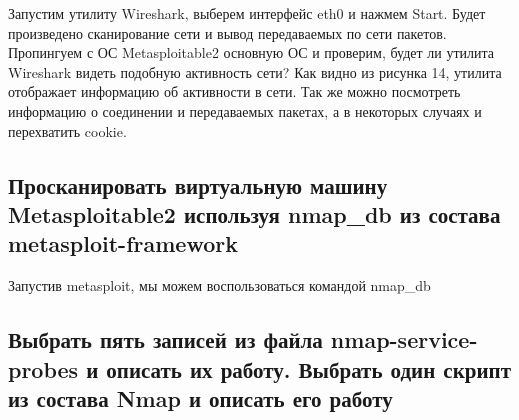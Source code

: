 \documentclass[11pt, a4paper]{article}		%
\begin{document}
Запустим утилиту Wireshark, выберем интерфейс eth0 и нажмем Start. Будет произведено сканирование сети и вывод передаваемых по сети пакетов. Пропингуем с ОС Metasploitable2 основную ОС и проверим, будет ли утилита Wireshark видеть подобную активность сети? Как видно из рисунка 14, утилита отображает информацию об активности в сети. Так же можно посмотреть информацию о соединении и передаваемых пакетах, а в некоторых случаях и перехватить cookie.


\subsection{Просканировать виртуальную машину Metasploitable2 используя nmap\_db из состава metasploit-framework}

Запустив metasploit, мы можем воспользоваться командой nmap\_db



\subsection{Выбрать пять записей из файла nmap-service-probes и описать их работу. Выбрать один скрипт из состава Nmap и описать его работу}
\end{document}
